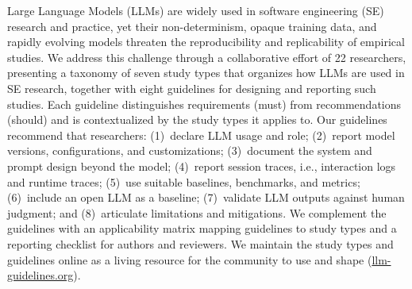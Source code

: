 Large Language Models (LLMs) are widely used in software engineering (SE)
research and practice, yet their non-determinism, opaque training data, and
rapidly evolving models threaten the reproducibility and replicability of
empirical studies.
We address this challenge through a collaborative effort of 22 researchers,
presenting a taxonomy of seven study types that organizes how LLMs are
used in SE research, together with eight guidelines for designing
and reporting such studies.
Each guideline distinguishes requirements (must) from recommendations
(should) and is contextualized by the study types it applies to.
Our guidelines recommend that researchers:
(1)~declare LLM usage and role;
(2)~report model versions, configurations, and customizations;
(3)~document the system and prompt design beyond the model;
(4)~report session traces, i.e., interaction logs and runtime traces;
(5)~use suitable baselines, benchmarks, and metrics;
(6)~include an open LLM as a baseline;
(7)~validate LLM outputs against human judgment; and
(8)~articulate limitations and mitigations.
We complement the guidelines with an applicability matrix mapping guidelines
to study types and a reporting checklist for authors and reviewers.
We maintain the study types and guidelines online as a living resource for the
community to use and shape
(\href{https://llm-guidelines.org/}{llm-guidelines.org}).

